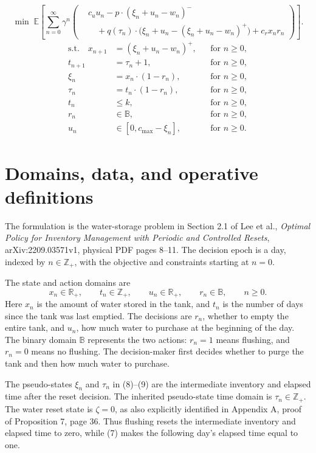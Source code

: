 \documentclass{article}
\begin{document}
\begin{equation}
\min\;\mathbb{E}\!\left[\sum_{n=0}^{\infty}\gamma^n\left(
\begin{aligned}
&c_u u_n-p\cdot(\xi_n+u_n-w_n)^-\\
&\quad+q(\tau_n)\cdot\bigl(\xi_n+u_n-(\xi_n+u_n-w_n)^+\bigr)
+c_r x_n r_n
\end{aligned}
\right)\right].
\tag{5}
\end{equation}
\begin{align}
\text{s.t.}\quad x_{n+1}&=(\xi_n+u_n-w_n)^+,
&&\text{for }n\geq0,\tag{6}\\
t_{n+1}&=\tau_n+1,
&&\text{for }n\geq0,\tag{7}\\
\xi_n&=x_n\cdot(1-r_n),
&&\text{for }n\geq0,\tag{8}\\
\tau_n&=t_n\cdot(1-r_n),
&&\text{for }n\geq0,\tag{9}\\
t_n&\leq k,
&&\text{for }n\geq0,\tag{10}\\
r_n&\in\mathbb{B},
&&\text{for }n\geq0,\tag{11}\\
u_n&\in[0,c_{\max}-\xi_n],
&&\text{for }n\geq0.\tag{12}
\end{align}

\section*{Domains, data, and operative definitions}
The formulation is the water-storage problem in Section 2.1 of Lee et al., \emph{Optimal Policy for Inventory Management with Periodic and Controlled Resets}, arXiv:2209.03571v1, physical PDF pages 8--11. The decision epoch is a day, indexed by $n\in\mathbb{Z}_+$, with the objective and constraints starting at $n=0$.

The state and action domains are
\[
x_n\in\mathbb{R}_+,\qquad t_n\in\mathbb{Z}_+,\qquad
u_n\in\mathbb{R}_+,\qquad r_n\in\mathbb{B},
\qquad n\geq0.
\]
Here $x_n$ is the amount of water stored in the tank, and $t_n$ is the number of days since the tank was last emptied. The decisions are $r_n$, whether to empty the entire tank, and $u_n$, how much water to purchase at the beginning of the day. The binary domain $\mathbb{B}$ represents the two actions: $r_n=1$ means flushing, and $r_n=0$ means no flushing. The decision-maker first decides whether to purge the tank and then how much water to purchase.

The pseudo-states $\xi_n$ and $\tau_n$ in (8)--(9) are the intermediate inventory and elapsed time after the reset decision. The inherited pseudo-state time domain is $\tau_n\in\mathbb{Z}_+$. The water reset state is $\zeta=0$, as also explicitly identified in Appendix A, proof of Proposition 7, page 36. Thus flushing resets the intermediate inventory and elapsed time to zero, while (7) makes the following day's elapsed time equal to one.
\end{document}

